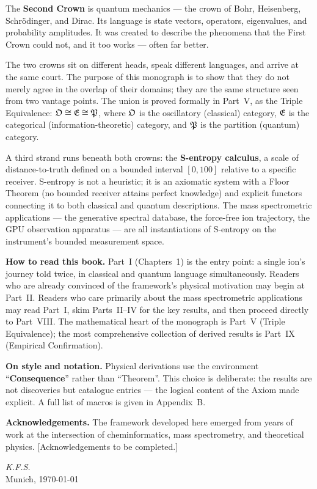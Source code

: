 The \textbf{Second Crown} is quantum mechanics --- the crown of Bohr,
Heisenberg, Schrödinger, and Dirac.
Its language is state vectors, operators, eigenvalues, and probability
amplitudes.
It was created to describe the phenomena that the First Crown could not, and
it too works --- often far better.

The two crowns sit on different heads, speak different languages, and
arrive at the same court.
The purpose of this monograph is to show that they do not merely agree
in the overlap of their domains; they are the same structure seen from
two vantage points.
The union is proved formally in Part~V, as the Triple Equivalence:
$\mathfrak{O} \cong \mathfrak{E} \cong \mathfrak{P}$, where $\mathfrak{O}$ is the oscillatory (classical)
category, $\mathfrak{E}$ is the categorical (information-theoretic) category, and
$\mathfrak{P}$ is the partition (quantum) category.

A third strand runs beneath both crowns: the \textbf{S-entropy calculus},
a scale of distance-to-truth defined on a bounded interval $[0, 100]$ relative
to a specific receiver.
S-entropy is not a heuristic; it is an axiomatic system with a Floor Theorem
(no bounded receiver attains perfect knowledge) and explicit functors connecting
it to both classical and quantum descriptions.
The mass spectrometric applications --- the generative spectral database, the
force-free ion trajectory, the GPU observation apparatus --- are all
instantiations of S-entropy on the instrument's bounded measurement space.

\bigskip
\noindent\textbf{How to read this book.}
Part~I (Chapters~1) is the entry point: a single ion's journey told twice,
in classical and quantum language simultaneously.
Readers who are already convinced of the framework's physical motivation may
begin at Part~II.
Readers who care primarily about the mass spectrometric applications may read
Part~I, skim Parts~II--IV for the key results, and then proceed directly to
Part~VIII.
The mathematical heart of the monograph is Part~V (Triple Equivalence);
the most comprehensive collection of derived results is Part~IX
(Empirical Confirmation).

\bigskip
\noindent\textbf{On style and notation.}
Physical derivations use the environment ``\textbf{Consequence}'' rather than
``Theorem''.
This choice is deliberate: the results are not discoveries but catalogue entries
--- the logical content of the Axiom made explicit.
A full list of macros is given in Appendix~B.

\bigskip
\noindent\textbf{Acknowledgements.}
The framework developed here emerged from years of work at the intersection of
cheminformatics, mass spectrometry, and theoretical physics.
[Acknowledgements to be completed.]

\vfill
\begin{flushright}
\textit{K.F.S.}\\
Munich, \today
\end{flushright}
